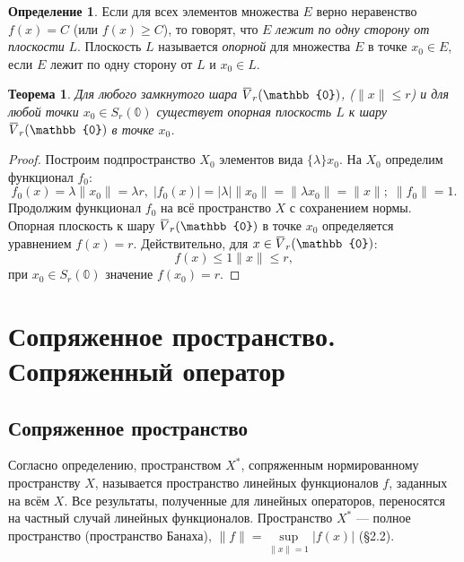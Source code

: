 \documentclass[12pt,a4paper,titlepage,oneside]{book}
\newcommand{\overbar}[1]{\mkern 1.5mu\overline{\mkern-1.5mu#1\mkern-1.5mu}\mkern 1.5mu}
\theoremstyle{definition}
\newtheorem*{definition}{Определение}
\theoremstyle{plain}
\newtheorem*{theorem}{Теорема}
\theoremstyle{break}
\theoremstyle{remark}
\theoremstyle{remark}
\theoremstyle{remark}
\theoremstyle{remark}
\theoremstyle{plain}
\theoremstyle{plain}
\begin{document}
\begin{definition}
Если для всех элементов множества $E$ верно неравенство $f(x)=C$ (или $f(x) \geqslant C$), то говорят, что $E$ \textit{лежит по одну сторону от плоскости} $L$. Плоскость $L$ называется \textit{опорной} для множества $E$ в точке $x_0 \in E$, если $E$ лежит по одну сторону от $L$ и $x_0 \in L$.
\end{definition}

\begin{theorem}
Для любого замкнутого шара $\overbar{V}_r(\mathbb{0})$, ($\lVert x \rVert \leqslant r$) и для любой точки $x_0 \in S_r(\mathbb{0})$ существует опорная плоскость $L$ к шару $\overbar{V}_r(\mathbb{0})$ в точке $x_0$.
\end{theorem}

\begin{proof}
Построим подпространство $X_0$ элементов вида $\{ \lambda \}x_0$. На $X_0$ определим функционал $f_0$:
\begin{equation*}
f_0(x)=\lambda \lVert x_0 \rVert = \lambda r, \; |f_0(x)|=|\lambda|\lVert x_0 \rVert=\lVert \lambda x_0 \rVert=\lVert x \rVert; \; \lVert f_0 \rVert=1.
\end{equation*}
Продолжим функционал $f_0$ на всё пространство $X$ с сохранением нормы. Опорная плоскость к шару $\overbar{V}_r(\mathbb{0})$ в точке $x_0$ определяется уравнением $f(x)=r$. Действительно, для $x \in \overbar{V}_r(\mathbb{0})$:
\begin{equation*}
f(x)\leqslant 1 \lVert x \rVert \leqslant r,
\end{equation*}
при $x_0 \in S_r(\mathbb{0})$ значение $f(x_0)=r$.
\qedhere
\end{proof}

\chapter{Сопряженное пространство. Сопряженный оператор}

\section{Сопряженное пространство}

Согласно определению, пространством $X^*$, сопряженным нормированному пространству $X$, называется пространство линейных функционалов $f$, заданных на всём $X$. Все результаты, полученные для линейных операторов, переносятся на частный случай линейных функционалов.
Пространство $X^*$ --- полное пространство (пространство Банаха), $\lVert f\rVert = \sup\limits_{\lVert x\rVert = 1}\lvert f(x)\rvert$ (\S 2.2).
\end{document}
